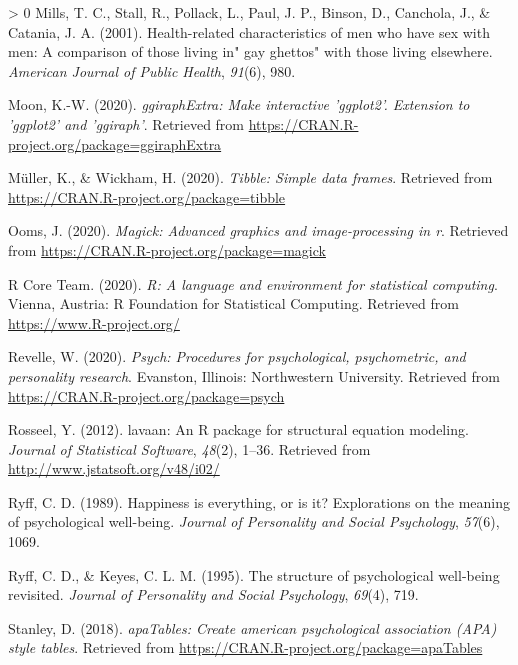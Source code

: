 \documentclass[
  english,
  man,floatsintext]{apa6}
\newlength{\cslhangindent}
\newenvironment{CSLReferences}[3] %
 {%
  \setlength{\parindent}{0pt}
  \ifodd #1 \everypar{\setlength{\hangindent}{\cslhangindent}}\ignorespaces\fi
  \ifnum #2 > 0
  \setlength{\parskip}{#2\baselineskip}
  \fi
 }%
 {}
\begin{document}
\begin{CSLReferences}{1}{0}
\leavevmode\hypertarget{ref-mills2001}{}%
Mills, T. C., Stall, R., Pollack, L., Paul, J. P., Binson, D., Canchola, J., \& Catania, J. A. (2001). Health-related characteristics of men who have sex with men: A comparison of those living in" gay ghettos" with those living elsewhere. \emph{American Journal of Public Health}, \emph{91}(6), 980.

\leavevmode\hypertarget{ref-R-ggiraphExtra}{}%
Moon, K.-W. (2020). \emph{ggiraphExtra: Make interactive 'ggplot2'. Extension to 'ggplot2' and 'ggiraph'}. Retrieved from \url{https://CRAN.R-project.org/package=ggiraphExtra}

\leavevmode\hypertarget{ref-R-tibble}{}%
Müller, K., \& Wickham, H. (2020). \emph{Tibble: Simple data frames}. Retrieved from \url{https://CRAN.R-project.org/package=tibble}

\leavevmode\hypertarget{ref-R-magick}{}%
Ooms, J. (2020). \emph{Magick: Advanced graphics and image-processing in r}. Retrieved from \url{https://CRAN.R-project.org/package=magick}

\leavevmode\hypertarget{ref-R-base}{}%
R Core Team. (2020). \emph{R: A language and environment for statistical computing}. Vienna, Austria: R Foundation for Statistical Computing. Retrieved from \url{https://www.R-project.org/}

\leavevmode\hypertarget{ref-R-psych}{}%
Revelle, W. (2020). \emph{Psych: Procedures for psychological, psychometric, and personality research}. Evanston, Illinois: Northwestern University. Retrieved from \url{https://CRAN.R-project.org/package=psych}

\leavevmode\hypertarget{ref-R-lavaan}{}%
Rosseel, Y. (2012). {lavaan}: An {R} package for structural equation modeling. \emph{Journal of Statistical Software}, \emph{48}(2), 1--36. Retrieved from \url{http://www.jstatsoft.org/v48/i02/}

\leavevmode\hypertarget{ref-ryff1989}{}%
Ryff, C. D. (1989). Happiness is everything, or is it? Explorations on the meaning of psychological well-being. \emph{Journal of Personality and Social Psychology}, \emph{57}(6), 1069.

\leavevmode\hypertarget{ref-ryffkeyes1995}{}%
Ryff, C. D., \& Keyes, C. L. M. (1995). The structure of psychological well-being revisited. \emph{Journal of Personality and Social Psychology}, \emph{69}(4), 719.

\leavevmode\hypertarget{ref-R-apaTables}{}%
Stanley, D. (2018). \emph{apaTables: Create american psychological association (APA) style tables}. Retrieved from \url{https://CRAN.R-project.org/package=apaTables}


\end{CSLReferences}
\end{document}

